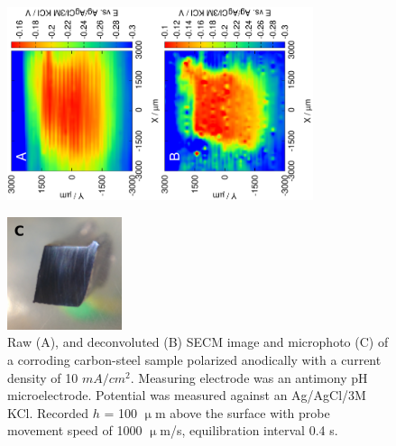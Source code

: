 \begin{figure}
\centering
\includegraphics[trim = 10mm 30mm 0mm 10mm, clip, width=0.4\textwidth, angle=-90]{img/carbon_steel/16012906.eps}\includegraphics[trim = 10mm 30mm 0mm 10mm, clip, width=0.4\textwidth, angle=-90]{img/carbon_steel/16012906_deconvoluted.eps}

\includegraphics[width=0.3\textwidth]{img/carbon_steel/cs_cut.jpg}

\caption[Raw, and deconvoluted SECM image and microphoto of a corroding carbon-steel sample polarized anodically.]{Raw (A), and deconvoluted (B) SECM image and microphoto (C) of a corroding carbon-steel sample polarized anodically with a current density of 10 $mA/cm^2$.
Measuring electrode was an antimony pH microelectrode.
Potential was measured against an Ag/AgCl/3M KCl.
Recorded $h$ = 100 $\upmu$m above the surface with probe movement speed of 1000 $\upmu$m/s, equilibration interval 0.4 s.}
\label{fig:carbon_steel}
\end{figure}

